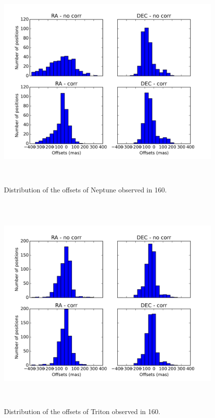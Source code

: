 \documentclass[12pt,a4paper]{report}
\begin{document}
\begin{figure}[h]
\centering
\includegraphics[height=11.0cm]{dist_Netuno_160.png} 
\caption{Distribution of the offsets of Neptune observed in 160.}
\label{Fig:refraction-net-160}
\end{figure}
\begin{figure}[h]
\centering
\includegraphics[height=11.0cm]{dist_Triton_160.png} 
\caption{Distribution of the offsets of Triton observed in 160.}
\label{Fig:refraction-tri-160}
\end{figure}
\end{document}

